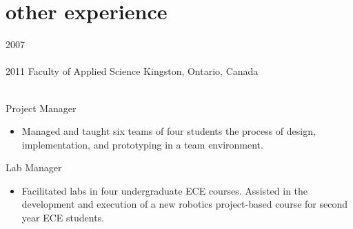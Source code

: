 
\section{other experience}

\begin{entrylist}
\entry
  {2007\\\faChevronDown\\2011}
  {Faculty of Applied Science}
  {Kingston, Ontario, Canada}
  {\\
  Project Manager
  \begin{itemize}[leftmargin=12pt]
    \item Managed and taught six teams of four students the process of design, implementation, and prototyping in a team environment.
  \end{itemize}
  Lab Manager
  \begin{itemize}[leftmargin=12pt]
    \item Facilitated labs in four undergraduate ECE courses. Assisted in the development and execution of a new robotics project-based course for second year ECE students.
  \end{itemize}}
\end{entrylist}
